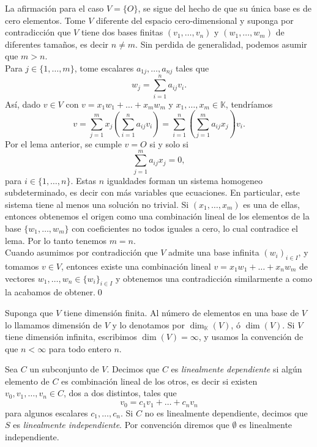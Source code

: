 \dem La afirmaci\'on para el caso $V=\{O\}$, se sigue del hecho de que su \'unica base es de cero elementos. Tome $V$ diferente del espacio cero-dimensional y suponga por contradicci\'on que $V$ tiene dos bases finitas $(v_1,\ldots, v_n)$ y $(w_1,\ldots, w_m)$ de diferentes tamaños, es decir $n\ne m$. Sin perdida de generalidad, podemos asumir que $m>n$.\\
Para $j\in\{1,\ldots,m\}$, tome escalares $a_{1j},\ldots,a_{nj}$ tales que $$w_j=\sum_{i=1}^n a_{ij}v_i.$$ As\'i, dado $v\in V$ con $v=x_1w_1+\ldots+x_mw_m$ y $x_1,\ldots,x_m\in\mathbb{K}$, tendr\'iamos
$$v = \sum_{j=1}^m x_j\left(\sum_{i=1}^n a_{ij}v_i\right) = \sum_{i=1}^n\left(\sum_{j=1}^m a_{ij}x_j\right)v_i.$$
Por el lema anterior, se cumple $v=O$ si y solo si
\[
\sum_{j=1}^m a_{ij}x_j=0,
\]
para $i\in\{1,\ldots,n\}$. Estas $n$ igualdades forman un sistema homogeneo subdeterminado, es decir con m\'as variables que ecuaciones. En particular, este sistema tiene al menos una solución no trivial. Si $(x_1,\ldots,x_m)$ es una de ellas, entonces obtenemos el origen como una combinaci\'on lineal de los elementos de la base $\{w_1,\ldots, w_m\}$ con coeficientes no todos iguales a cero, lo cual contradice el lema. Por lo tanto tenemos $m=n$.\\
Cuando asumimos por contradicción que $V$ admite una base infinita $(w_i)_{i\in I}$, y tomamos $v\in V$, entonces existe una combinación lineal $v=x_1w_1+\ldots+x_nw_m$ de vectores $w_1,\ldots,w_n\in\{w_i\}_{i\in I}$ y obtenemos una contradicción similarmente a como la acabamos de obtener.\qed

\begin{defn}
Suponga que $V$ tiene dimensi\'on finita. Al n\'umero de elementos en una base de $V$ lo llamamos dimensi\'on de $V$ y lo denotamos por $\dim_\mathbb{K}(V)$, ó $\dim (V)$. Si $V$ tiene dimensi\'on infinita, escribimos $\dim(V)=\infty$, y usamos la convenci\'on de que $n<\infty$ para todo entero $n$.
\end{defn}

\begin{defn}
Sea $C$ un subconjunto de $V$. Decimos que $C$ es \emph{linealmente dependiente} si alg\'un elemento de $C$ es combinaci\'on lineal de los otros, es decir si existen $v_0,v_1,\ldots,v_n\in C$, dos a dos distintos, tales que
\[
v_0=c_1v_1+\ldots+c_nv_n
\]
para algunos escalares $c_1,\ldots,c_n$. Si $C$ no es linealmente dependiente, decimos que $S$ es \emph{linealmente independiente}. Por convención diremos que $\emptyset$ es linealmente independiente.
\end{defn}

